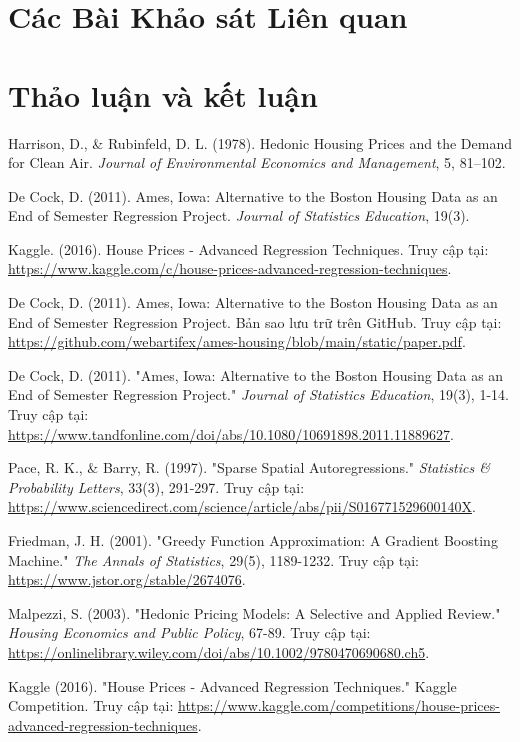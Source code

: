 \documentclass{article}
\begin{document}
\section{Các Bài Khảo sát Liên quan}


\section{Thảo luận và kết luận}

\begin{thebibliography}{9}

Harrison, D., \& Rubinfeld, D. L. (1978). Hedonic Housing Prices and the Demand for Clean Air. \textit{Journal of Environmental Economics and Management}, 5, 81--102.

De Cock, D. (2011). Ames, Iowa: Alternative to the Boston Housing Data as an End of Semester Regression Project. \textit{Journal of Statistics Education}, 19(3).

Kaggle. (2016). House Prices - Advanced Regression Techniques. Truy cập tại: \url{https://www.kaggle.com/c/house-prices-advanced-regression-techniques}.

De Cock, D. (2011). Ames, Iowa: Alternative to the Boston Housing Data as an End of Semester Regression Project. Bản sao lưu trữ trên GitHub. Truy cập tại: \url{https://github.com/webartifex/ames-housing/blob/main/static/paper.pdf}.

De Cock, D. (2011). "Ames, Iowa: Alternative to the Boston Housing Data as an End of Semester Regression Project." \textit{Journal of Statistics Education}, 19(3), 1-14. Truy cập tại: \url{https://www.tandfonline.com/doi/abs/10.1080/10691898.2011.11889627}.

Pace, R. K., \& Barry, R. (1997). "Sparse Spatial Autoregressions." \textit{Statistics \& Probability Letters}, 33(3), 291-297. Truy cập tại: \url{https://www.sciencedirect.com/science/article/abs/pii/S016771529600140X}.

Friedman, J. H. (2001). "Greedy Function Approximation: A Gradient Boosting Machine." \textit{The Annals of Statistics}, 29(5), 1189-1232. Truy cập tại: \url{https://www.jstor.org/stable/2674076}.

Malpezzi, S. (2003). "Hedonic Pricing Models: A Selective and Applied Review." \textit{Housing Economics and Public Policy}, 67-89. Truy cập tại: \url{https://onlinelibrary.wiley.com/doi/abs/10.1002/9780470690680.ch5}.

Kaggle (2016). "House Prices - Advanced Regression Techniques." Kaggle Competition. Truy cập tại: \url{https://www.kaggle.com/competitions/house-prices-advanced-regression-techniques}.

\end{thebibliography}
\end{document}
